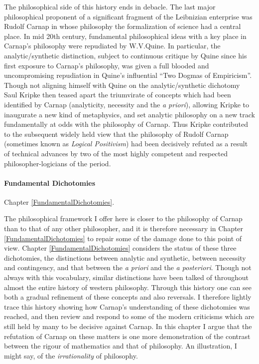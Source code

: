 The philosophical side of this history ends in debacle.
The last major philosophical proponent of a significant fragment of
the Leibnizian enterprise was Rudolf Carnap in whose philosophy the
formalization of science had a central place.
In mid 20th century, fundamental philosophical ideas with a key
place in Carnap's philosophy were repudiated by W.V.Quine.
In particular, the analytic/synthetic distinction, subject to
continuous critique by Quine since his first exposure to Carnap's
philosophy, was given a full blooded and uncompromising repudiation in
Quine's influential ``Two Dogmas of Empiricism''.
Though not aligning himself with Quine on the analytic/synthetic
dichotomy Saul Kripke then teased apart the triumvirate of concepts
which had been identified by Carnap (analyticity, necessity and the
{\it a priori}), allowing Kripke to inaugurate a new kind of
metaphysics, and set analytic philosophy on a new track fundamentally
at odds with the philosophy of Carnap.
Thus Kripke contributed to the subsequent widely held view that the
philosophy of Rudolf Carnap (sometimes known as {\it Logical
  Positivism}) had been decisively refuted as a result of technical
advances by two of the most highly competent and respected
philosopher-logicians of the period.

\paragraph{Fundamental Dichotomies}

Chapter \ref{FundamentalDichotomies}.

The philosophical framework I offer here is closer to the philosophy
of Carnap than to that of any other philosopher, and it is therefore
necessary in Chapter \ref{FundamentalDichotomies} to repair some of
the damage done to this point of view.
Chapter \ref{FundamentalDichotomies} considers the status of these three dichotomies, the
distinctions between analytic and synthetic, between necessity and
contingency, and that between the {\it a priori} and the {\it a posteriori}.
Though not always with this vocabulary, similar distinctions have been
talked of throughout almost the entire history of western philosophy.
Through this history one can see both a gradual refinement of these
concepts and also reversals.
I therefore lightly trace this history showing how Carnap's
understanding of these dichotomies was reached, and then review and
respond to some of the modern criticisms which are still held by many
to be decisive against Carnap.
In this chapter I argue that the refutation of Carnap on these matters
is one more demonstration of the contrast between the rigour of
mathematics and that of philosophy.
An illustration, I might say, of the {\it irrationality} of philosophy.

